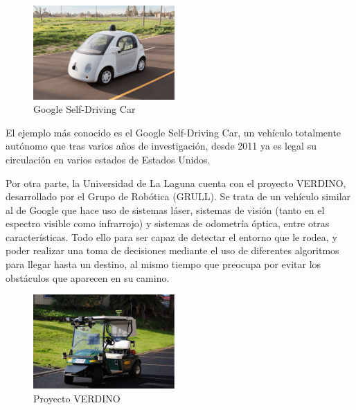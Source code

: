 \begin{figure}
  \vspace{-20pt}
  \begin{center}
    \includegraphics[width=0.48\textwidth]{images/cap1/GoogleSelf-DrivingCar.eps}
  \end{center}
  \vspace{-20pt}
  \caption{Google Self-Driving Car}
  \vspace{-10pt}
  \label{fig:GoogleSelf-DrivingCar}
\end{figure}

El ejemplo más conocido es el Google Self-Driving Car, un
vehículo totalmente autónomo que tras varios años de investigación, desde 2011
ya es legal su circulación en varios estados de Estados Unidos.

Por otra parte, la Universidad de La Laguna cuenta con el proyecto VERDINO,
desarrollado por el Grupo de Robótica (GRULL). Se trata de un vehículo similar
al de Google que hace uso de sistemas láser, sistemas de visión (tanto en el
espectro visible como infrarrojo) y sistemas de odometría óptica, entre otras
características. Todo ello para ser capaz de detectar el entorno que le rodea,
y poder realizar una toma de decisiones mediante el uso de diferentes algoritmos
para llegar hasta un destino, al mismo tiempo que preocupa por evitar los
obstáculos que aparecen en su camino.

\begin{figure}
  \vspace{-20pt}
  \begin{center}
    \includegraphics[width=0.48\textwidth]{images/cap1/Verdino.eps}
  \end{center}
  \vspace{-20pt}
  \caption{Proyecto VERDINO}
  \vspace{-10pt}
  \label{fig:ProyectoVERDINO}
\end{figure}

